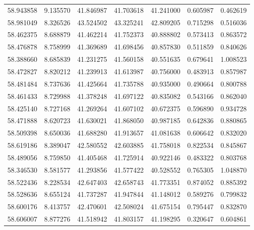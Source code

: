 \begin{tabular}{rrrrrrr}
 58.943858 &   9.135570 &         41.846987 &         41.703618 &         41.241000 &  0.605987 &  0.462619 \\
 58.981049 &   8.326526 &         43.524502 &         43.325241 &         42.809205 &  0.715298 &  0.516036 \\
 58.462375 &   8.688879 &         41.462214 &         41.752373 &         40.888802 &  0.573413 &  0.863572 \\
 58.476878 &   8.758999 &         41.369689 &         41.698456 &         40.857830 &  0.511859 &  0.840626 \\
 58.388660 &   8.685839 &         41.231275 &         41.560158 &         40.551635 &  0.679641 &  1.008523 \\
 58.472827 &   8.820212 &         41.239913 &         41.613987 &         40.756000 &  0.483913 &  0.857987 \\
 58.481484 &   8.737636 &         41.425664 &         41.735788 &         40.935000 &  0.490664 &  0.800788 \\
 58.461433 &   8.729988 &         41.378248 &         41.697122 &         40.835082 &  0.543166 &  0.862040 \\
 58.425140 &   8.727168 &         41.269264 &         41.607102 &         40.672375 &  0.596890 &  0.934728 \\
 58.471888 &   8.620723 &         41.630021 &         41.868050 &         40.987185 &  0.642836 &  0.880865 \\
 58.509398 &   8.650036 &         41.688280 &         41.913657 &         41.081638 &  0.606642 &  0.832020 \\
 58.619186 &   8.389047 &         42.580552 &         42.603885 &         41.758018 &  0.822534 &  0.845867 \\
 58.489056 &   8.759850 &         41.405468 &         41.725914 &         40.922146 &  0.483322 &  0.803768 \\
 58.346530 &   8.581577 &         41.293856 &         41.577422 &         40.528552 &  0.765305 &  1.048870 \\
 58.522436 &   8.228534 &         42.647403 &         42.658743 &         41.773351 &  0.874052 &  0.885392 \\
 58.528636 &   8.655124 &         41.737287 &         41.947844 &         41.148012 &  0.589276 &  0.799832 \\
 58.600176 &   8.413757 &         42.470601 &         42.508024 &         41.675154 &  0.795447 &  0.832870 \\
 58.606007 &   8.877276 &         41.518942 &         41.803157 &         41.198295 &  0.320647 &  0.604861 \\

\end{tabular}
